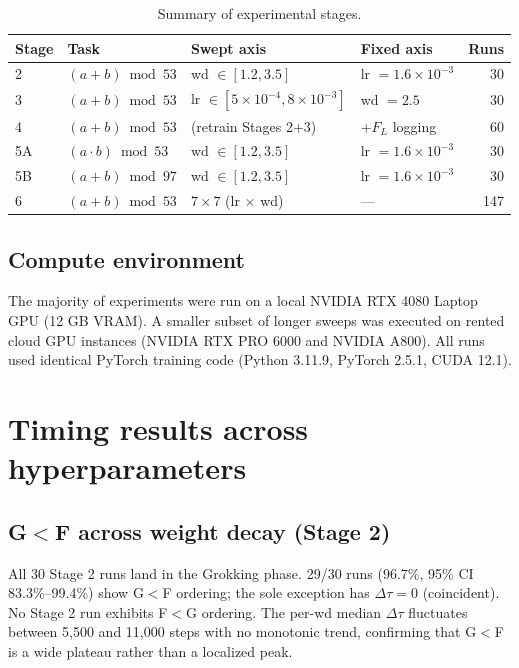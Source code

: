 \documentclass[12pt,openany,a4paper]{book}
\newcommand{\Dtau}{\Delta\tau}
\newcommand{\flogit}{F_{L}}
\begin{document}
\begin{table}[htbp]
  \centering
  \caption{Summary of experimental stages.}
  \label{tab:stages}
  \small
  \begin{tabular}{llllr}
    \toprule
    Stage & Task & Swept axis & Fixed axis & Runs \\
    \midrule
    2 & $(a{+}b)\bmod 53$ & wd $\in [1.2, 3.5]$ & lr $= 1.6\!\times\!10^{-3}$ & 30 \\
    3 & $(a{+}b)\bmod 53$ & lr $\in [5\!\times\!10^{-4}, 8\!\times\!10^{-3}]$ & wd $= 2.5$ & 30 \\
    4 & $(a{+}b)\bmod 53$ & (retrain Stages 2+3) & $+\flogit$ logging & 60 \\
    5A & $(a{\cdot}b)\bmod 53$ & wd $\in [1.2, 3.5]$ & lr $= 1.6\!\times\!10^{-3}$ & 30 \\
    5B & $(a{+}b)\bmod 97$ & wd $\in [1.2, 3.5]$ & lr $= 1.6\!\times\!10^{-3}$ & 30 \\
    6 & $(a{+}b)\bmod 53$ & $7\!\times\!7$ (lr $\times$ wd) & --- & 147 \\
    \bottomrule
  \end{tabular}
\end{table}

\section{Compute environment}

The majority of experiments were run on a local NVIDIA RTX 4080 Laptop GPU (12 GB VRAM). A smaller subset of longer sweeps was executed on rented cloud GPU instances (NVIDIA RTX PRO 6000 and NVIDIA A800). All runs used identical PyTorch training code (Python 3.11.9, PyTorch 2.5.1, CUDA 12.1).


\chapter{Timing results across hyperparameters}
\label{ch:timing}

\section{G$<$F across weight decay (Stage 2)}

All 30 Stage 2 runs land in the Grokking phase. 29/30 runs (96.7\%, 95\% CI 83.3\%--99.4\%) show G$<$F ordering; the sole exception has $\Dtau=0$ (coincident). No Stage 2 run exhibits F$<$G ordering. The per-wd median $\Dtau$ fluctuates between 5,500 and 11,000 steps with no monotonic trend, confirming that G$<$F is a wide plateau rather than a localized peak.
\end{document}
